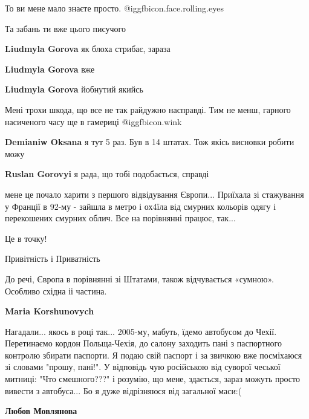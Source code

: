 \begin{itemize}
То ви мене мало знаєте просто.  @igg{fbicon.face.rolling.eyes} 

Та забань ти вже цього писучого

\begin{itemize} %
\textbf{Liudmyla Gorova} як блоха стрибає, зараза

\textbf{Liudmyla Gorova} вже

\textbf{Liudmyla Gorova} йобнутий якийсь
\end{itemize} %


Мені трохи шкода, що все не так райдужно насправді.
Тим не менш, гарного насиченого часу ще в гамериці @igg{fbicon.wink} 

\begin{itemize} %
\textbf{Demianiw Oksana} я тут 5 раз. Був в 14 штатах. Тож якісь висновки робити можу

\textbf{Ruslan Gorovyi} я рада, що тобі подобається, справді
\end{itemize} %


мене це почало харити з першого відвідування Європи... Приїхала зі стажування у
Франції в 92-му - зайшла в метро і ох4їла від смурних кольорів одягу і
перекошених смурних облич. Все на порівнянні працює, так...


Це в точку!

Привітність і Приватність

До речі, Європа в порівнянні зі Штатами, також відчувається «сумною». Особливо східна іі частина.

\begin{itemize} %
\textbf{Maria Korshunovych} 

Нагадали... якось в році так... 2005-му, мабуть, їдемо автобусом до Чехії.
Перетинаємо кордон Польща-Чехія, до салону заходить пані з паспортного контролю
збирати паспорти. Я подаю свій паспорт і за звичкою вже посміхаюся зі словами
"прошу, пані!". У відповідь чую російською від суворої чеської митниці: "Что
смешного???" і розумію, що мене, здається, зараз можуть просто вивести з
автобуса... Бо я дуже відрізняюся від загальної маси:(


\textbf{Любов Мовлянова} 


\end{itemize}
\end{itemize}
